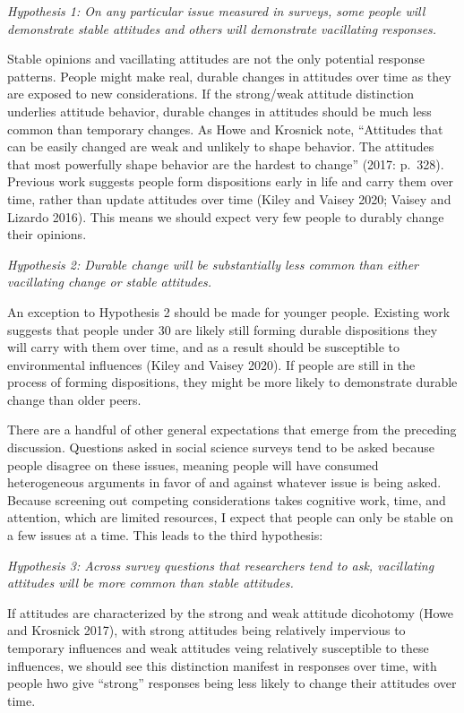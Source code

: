 \documentclass[12pt,]{article}
\begin{document}
\emph{Hypothesis 1: On any particular issue measured in surveys, some people will demonstrate stable attitudes and others will demonstrate vacillating responses.}

Stable opinions and vacillating attitudes are not the only potential response patterns. People might make real, durable changes in attitudes over time as they are exposed to new considerations. If the strong/weak attitude distinction underlies attitude behavior, durable changes in attitudes should be much less common than temporary changes. As Howe and Krosnick note, ``Attitudes that can be easily changed are weak and unlikely to shape behavior. The attitudes that most powerfully shape behavior are the hardest to change'' (2017: p.~328). Previous work suggests people form dispositions early in life and carry them over time, rather than update attitudes over time (Kiley and Vaisey 2020; Vaisey and Lizardo 2016). This means we should expect very few people to durably change their opinions.

\emph{Hypothesis 2: Durable change will be substantially less common than either vacillating change or stable attitudes.}

An exception to Hypothesis 2 should be made for younger people. Existing work suggests that people under 30 are likely still forming durable dispositions they will carry with them over time, and as a result should be susceptible to environmental influences (Kiley and Vaisey 2020). If people are still in the process of forming dispositions, they might be more likely to demonstrate durable change than older peers.

There are a handful of other general expectations that emerge from the preceding discussion. Questions asked in social science surveys tend to be asked because people disagree on these issues, meaning people will have consumed heterogeneous arguments in favor of and against whatever issue is being asked. Because screening out competing considerations takes cognitive work, time, and attention, which are limited resources, I expect that people can only be stable on a few issues at a time. This leads to the third hypothesis:

\emph{Hypothesis 3: Across survey questions that researchers tend to ask, vacillating attitudes will be more common than stable attitudes.}

If attitudes are characterized by the strong and weak attitude dicohotomy (Howe and Krosnick 2017), with strong attitudes being relatively impervious to temporary influences and weak attitudes veing relatively susceptible to these influences, we should see this distinction manifest in responses over time, with people hwo give ``strong'' responses being less likely to change their attitudes over time.
\end{document}
